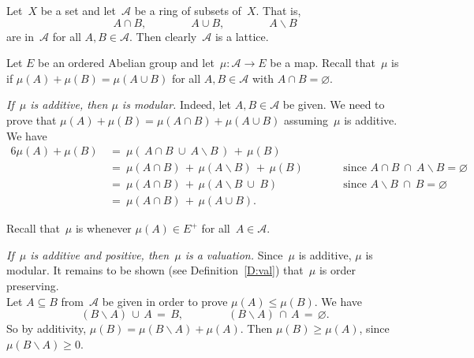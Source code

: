 \documentclass[main.tex]{subfiles}
\begin{document}
%
%
\begin{ex}
\label{E:ring-val}
Let~$X$ be a set and let~$\mathcal{A}$ be a ring of subsets of~$X$.
That is,
\begin{equation*}
A\cap B,\qquad\qquad A\cup B,\qquad\qquad A\backslash B
\end{equation*}
are in~$\mathcal{A}$ for all $A,B\in\mathcal{A}$.
Then clearly~$\mathcal{A}$ is a lattice.

Let $E$ be an ordered Abelian group
and let~$\mu\colon \mathcal{A}\rightarrow E$ be a map.
Recall that~$\mu$ is  if $\mu(A) + \mu(B) = \mu(A\cup B)$
for all $A,B\in\mathcal{A}$ with $A\cap B=\varnothing$.

\emph{If~$\mu$ is additive,
then $\mu$ is modular.}
Indeed,
let $A,B\in \mathcal{A}$ be given. We need to prove that
$\mu(A) + \mu(B) =\mu(A\cap B) + \mu(A\cup B)$
assuming~$\mu$ is additive.
We have
\begin{alignat*}{6}
\mu(A) + \mu(B) \,
  & =\  \mu(\,A\cap B \ \cup\ A\backslash B\,) \,+\, \mu(B) \\ 
  & =\  \mu(A\cap B) \,+\, \mu(A\backslash B)  \,+\, \mu(B)\qquad
    && \text{since } A\cap B \ \cap\ A\backslash B = \varnothing \\ 
  & =\  \mu(A\cap B) \,+\, \mu(A\backslash B \ \cup\ B ) 
    && \text{since } A\backslash B\ \cap\ B = \varnothing \\
  & =\  \mu(A\cap B) \,+\, \mu(A\cup B).
\end{alignat*}

Recall that~$\mu$ is  whenever
$\mu(A)\in E^+$ for all~$A\in\mathcal{A}$.

\emph{If~$\mu$ is additive and positive,
then~$\mu$ is a valuation.}
Since~$\mu$ is additive,
$\mu$ is modular.
It remains to be shown 
(see Definition~\ref{D:val})
that~$\mu$ is order preserving.\\
Let $A\subseteq B$ from~$\mathcal{A}$ be given
in order to prove $\mu(A)\leq \mu(B)$.
We have
\begin{equation*}
(B\backslash A)\,\cup\, A\,=\,B,\qquad\qquad 
(B\backslash A)\,\cap\, A\,=\,\varnothing.
\end{equation*}
So by additivity, 
$\mu(B)=\mu(B\backslash A)+\mu(A)$.
Then $\mu(B)\geq \mu(A)$, since $\mu(B\backslash A)\geq 0$.
\end{ex}
\end{document}
